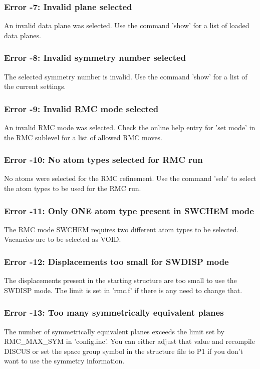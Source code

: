 \subsubsection{Error -7: Invalid plane selected}
\par
An invalid data plane was selected. Use the command 'show' for a list 
of loaded data planes. 
\subsubsection{Error -8: Invalid symmetry number selected}
\par
The selected symmetry number is invalid. Use the command 'show' for a 
list of the current settings. 
\subsubsection{Error -9: Invalid RMC mode selected}
\par
An invalid RMC mode was selected. Check the online help entry for 
'set mode' in the RMC sublevel for a list of allowed RMC moves. 
\subsubsection{Error -10: No atom types selected for RMC run}
\par
No atoms were selected for the RMC refinement. Use the command 'sele' 
to select the atom types to be used for the RMC run. 
\subsubsection{Error -11: Only ONE atom type present in SWCHEM mode}
\par
The RMC mode SWCHEM requires two different atom types to be selected. 
Vacancies are to be selected as VOID. 
\subsubsection{Error -12: Displacements too small for SWDISP mode}
\par
The displacements present in the starting structure are too small 
to use the SWDISP mode. The limit is set in 'rmc.f' if there is any 
need to change that. 
\subsubsection{Error -13: Too many symmetrically equivalent planes}
\par
The number of symmetrically equivalent planes exceeds the limit 
set by RMC\_MAX\_SYM in 'config.inc'. You can either adjust that 
value and recompile DISCUS or set the space group symbol in the 
structure file to P1 if you don't want to use the symmetry information. 

